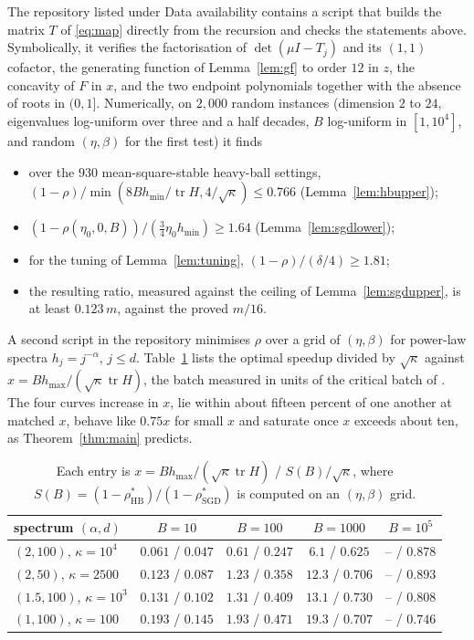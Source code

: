 \documentclass[11pt]{amsart}
\theoremstyle{definition}
\theoremstyle{remark}
\numberwithin{equation}{section}
\newcommand{\tr}{\operatorname{tr}}
\newcommand{\hmax}{h_{\max}}
\newcommand{\hmin}{h_{\min}}
\begin{document}
The repository listed under Data availability contains a script that builds the matrix $T$ of \eqref{eq:map} directly from the recursion and checks the statements above. Symbolically, it verifies the factorisation of $\det(\mu I-T_j)$ and its $(1,1)$ cofactor, the generating function of Lemma~\ref{lem:gf} to order $12$ in $z$, the concavity of $F$ in $x$, and the two endpoint polynomials together with the absence of roots in $(0,1]$. Numerically, on $2{,}000$ random instances (dimension $2$ to $24$, eigenvalues log-uniform over three and a half decades, $B$ log-uniform in $[1,10^4]$, and random $(\eta,\beta)$ for the first test) it finds
\begin{itemize}[leftmargin=2em]
\item over the $930$ mean-square-stable heavy-ball settings, $(1-\rho)/\min(8B\hmin/\tr H,4/\sqrt\kappa)\le0.766$ (Lemma~\ref{lem:hbupper});
\item $(1-\rho(\eta_0,0,B))/(\frac34\eta_0\hmin)\ge1.64$ (Lemma~\ref{lem:sgdlower});
\item for the tuning of Lemma~\ref{lem:tuning}, $(1-\rho)/(\delta/4)\ge1.81$;
\item the resulting ratio, measured against the ceiling of Lemma~\ref{lem:sgdupper}, is at least $0.123\,m$, against the proved $m/16$.
\end{itemize}
A second script in the repository minimises $\rho$ over a grid of $(\eta,\beta)$ for power-law spectra $h_j=j^{-\alpha}$, $j\le d$. Table~\ref{tab:powerlaw} lists the optimal speedup divided by $\sqrt\kappa$ against $x=B\hmax/(\sqrt\kappa\tr H)$, the batch measured in units of the critical batch of \cite{MMNK26}. The four curves increase in $x$, lie within about fifteen percent of one another at matched $x$, behave like $0.75x$ for small $x$ and saturate once $x$ exceeds about ten, as Theorem~\ref{thm:main} predicts.

\begin{table}[ht]
\centering
\begin{tabular}{lcccc}
\toprule
spectrum $(\alpha,d)$ & $B=10$ & $B=100$ & $B=1000$ & $B=10^5$\\
\midrule
$(2,100)$, $\kappa=10^4$ & $0.061$ / $0.047$ & $0.61$ / $0.247$ & $6.1$ / $0.625$ & -- / $0.878$\\
$(2,50)$, $\kappa=2500$ & $0.123$ / $0.087$ & $1.23$ / $0.358$ & $12.3$ / $0.706$ & -- / $0.893$\\
$(1.5,100)$, $\kappa=10^3$ & $0.131$ / $0.102$ & $1.31$ / $0.409$ & $13.1$ / $0.730$ & -- / $0.808$\\
$(1,100)$, $\kappa=100$ & $0.193$ / $0.145$ & $1.93$ / $0.471$ & $19.3$ / $0.707$ & -- / $0.746$\\
\bottomrule
\end{tabular}
\caption{Each entry is $x=B\hmax/(\sqrt\kappa\tr H)$ / $S(B)/\sqrt\kappa$, where $S(B)=(1-\rho^*_{\mathrm{HB}})/(1-\rho^*_{\mathrm{SGD}})$ is computed on an $(\eta,\beta)$ grid.}
\label{tab:powerlaw}
\end{table}
\end{document}
